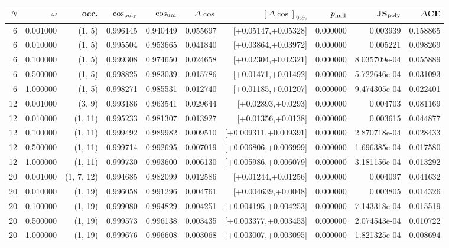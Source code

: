 \begin{tabular}{rrrrrrrrrr}
\toprule
$N$ & $\omega$ & occ. & $\cos_{\rm poly}$ & $\cos_{\rm uni}$ & $\Delta\cos$ & $[\Delta\cos]_{95\%}$ & $p_{\rm null}$ & JS$_{\rm poly}$ & $\Delta$CE \\
\midrule
6 & 0.001000 & (1, 5) & 0.996145 & 0.940449 & 0.055697 & [+0.05147,+0.05328] & 0.000000 & 0.003939 & 0.158865 \\
6 & 0.010000 & (1, 5) & 0.995504 & 0.953665 & 0.041840 & [+0.03864,+0.03972] & 0.000000 & 0.005221 & 0.098269 \\
6 & 0.100000 & (1, 5) & 0.999308 & 0.974650 & 0.024658 & [+0.02304,+0.02321] & 0.000000 & 8.035709e-04 & 0.055889 \\
6 & 0.500000 & (1, 5) & 0.998825 & 0.983039 & 0.015786 & [+0.01471,+0.01492] & 0.000000 & 5.722646e-04 & 0.031093 \\
6 & 1.000000 & (1, 5) & 0.998271 & 0.985531 & 0.012740 & [+0.01185,+0.01207] & 0.000000 & 9.474305e-04 & 0.022401 \\
12 & 0.001000 & (3, 9) & 0.993186 & 0.963541 & 0.029644 & [+0.02893,+0.0293] & 0.000000 & 0.004703 & 0.081169 \\
12 & 0.010000 & (1, 11) & 0.995233 & 0.981307 & 0.013927 & [+0.01356,+0.0138] & 0.000000 & 0.003615 & 0.044877 \\
12 & 0.100000 & (1, 11) & 0.999492 & 0.989982 & 0.009510 & [+0.009311,+0.009391] & 0.000000 & 2.870718e-04 & 0.028433 \\
12 & 0.500000 & (1, 11) & 0.999714 & 0.992695 & 0.007019 & [+0.006806,+0.006999] & 0.000000 & 1.696385e-04 & 0.017580 \\
12 & 1.000000 & (1, 11) & 0.999730 & 0.993600 & 0.006130 & [+0.005986,+0.006079] & 0.000000 & 3.181156e-04 & 0.013292 \\
20 & 0.001000 & (1, 7, 12) & 0.994685 & 0.982099 & 0.012586 & [+0.01244,+0.01256] & 0.000000 & 0.004097 & 0.041632 \\
20 & 0.010000 & (1, 19) & 0.996058 & 0.991296 & 0.004761 & [+0.004639,+0.0048] & 0.000000 & 0.003805 & 0.014326 \\
20 & 0.100000 & (1, 19) & 0.999080 & 0.994829 & 0.004251 & [+0.004195,+0.004253] & 0.000000 & 7.143318e-04 & 0.015519 \\
20 & 0.500000 & (1, 19) & 0.999573 & 0.996138 & 0.003435 & [+0.003377,+0.003453] & 0.000000 & 2.074543e-04 & 0.010722 \\
20 & 1.000000 & (1, 19) & 0.999676 & 0.996608 & 0.003068 & [+0.003007,+0.003095] & 0.000000 & 1.821325e-04 & 0.008694 \\
\bottomrule
\end{tabular}